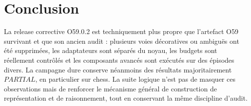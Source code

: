 \documentclass[11pt,a4paper]{article}
\begin{document}
\section{Conclusion}
La release corrective O59.0.2 est techniquement plus propre que l'artefact O59 survivant et que son ancien audit : plusieurs voies décoratives ou ambiguës ont été supprimées, les adaptateurs sont séparés du noyau, les budgets sont réellement contrôlés et les composants avancés sont exécutés sur des épisodes divers. La campagne dure conserve néanmoins des résultats majoritairement $PARTIAL$, en particulier sur chess. La suite logique n'est pas de masquer ces observations mais de renforcer le mécanisme général de construction de représentation et de raisonnement, tout en conservant la même discipline d'audit.
\end{document}
